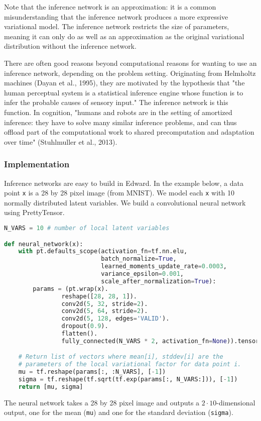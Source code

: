 Note that the inference network is an approximation: it is a common
misunderstanding that the inference network produces a more expressive
variational model. The inference network restricts the size of
parameters, meaning it can only do as well as an approximation as the
original variational distribution without the inference network.

There are often good reasons beyond computational reasons
for wanting to use an inference network, depending on the problem
setting.
Originating from
Helmholtz machines (Dayan et al., 1995), they are motivated by the hypothesis
that "the human perceptual system is a statistical inference engine
whose function is to infer the probable causes of sensory input." The
inference network is this function.
In cognition, "humans and robots are in the setting of amortized
inference: they have to solve many similar inference problems, and can
thus offload part of the computational work to shared precomputation
and adaptation over time" (Stuhlmuller et al., 2013).

\subsubsection{Implementation}

Inference networks are easy to build in Edward.
In the example below, a data point \texttt{x} is a 28 by 28 pixel
image (from MNIST).
We model each \texttt{x} with 10 normally distributed latent
variables.
We build a convolutional neural network using PrettyTensor.
\begin{lstlisting}[language=Python]
N_VARS = 10 # number of local latent variables

def neural_network(x):
    with pt.defaults_scope(activation_fn=tf.nn.elu,
                           batch_normalize=True,
                           learned_moments_update_rate=0.0003,
                           variance_epsilon=0.001,
                           scale_after_normalization=True):
        params = (pt.wrap(x).
                reshape([28, 28, 1]).
                conv2d(5, 32, stride=2).
                conv2d(5, 64, stride=2).
                conv2d(5, 128, edges='VALID').
                dropout(0.9).
                flatten().
                fully_connected(N_VARS * 2, activation_fn=None)).tensor

    # Return list of vectors where mean[i], stddev[i] are the
    # parameters of the local variational factor for data point i.
    mu = tf.reshape(params[:, :N_VARS], [-1])
    sigma = tf.reshape(tf.sqrt(tf.exp(params[:, N_VARS:])), [-1])
    return [mu, sigma]
\end{lstlisting}
The neural network
takes a 28 by 28 pixel image and outputs a $2\cdot 10$-dimensional
output, one for the mean (\texttt{mu}) and one for the standard
deviation (\texttt{sigma}).

